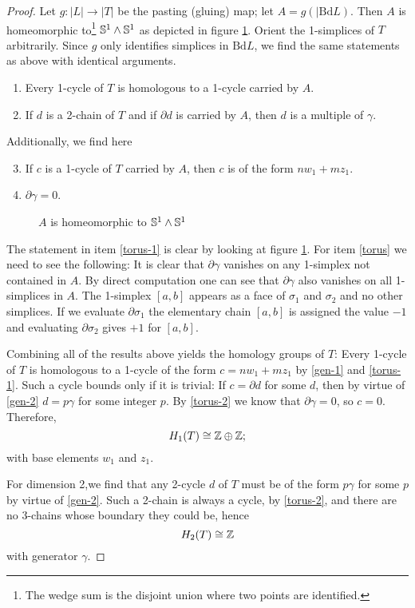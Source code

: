 \begin{proof}
	Let $g: |L|\to |T|$ be the pasting (gluing) map; let $A=g(|\mathrm{Bd} L)$. Then $A$ is homeomorphic to\footnote{The wedge sum is the disjoint union where two points are identified.} $\mathbb{S}^1\wedge \mathbb{S}^1$ as depicted in figure \ref{wege-of-s1}. Orient the 1-simplices of $T$ arbitrarily. Since $g$ only identifies simplices in $\mathrm{Bd} L$, we find the same statements as above with identical arguments.
	\begin{enumerate}
		\item \label{gen-1}Every 1-cycle of $T$ is homologous to a 1-cycle carried by $A$.
		\item \label{gen-2}If $d$ is a 2-chain of $T$ and if $\partial d$ is carried by $A$, then $d$ is a multiple of $\gamma$.
	\end{enumerate}
	Additionally, we find here
	\begin{enumerate}\setcounter{enumi}{2}
		\item \label{torus-1} If $c$ is a 1-cycle of $T$ carried by $A$, then $c$ is of the form $nw_1+mz_1$.
		\item \label{torus-2}$\partial \gamma=0$.
	\end{enumerate} 
	\begin{figure}
		\begin{center}
			\caption{$A$ is homeomorphic to $\mathbb{S}^1\wedge \mathbb{S}^1$\label{wege-of-s1}}
		\end{center}
	\end{figure}

The statement in item \ref{torus-1} is clear by looking at figure \ref{wege-of-s1}. For item \ref{torus} we need to see the following: 
It is clear that $\partial\gamma$ vanishes on any 1-simplex not contained in $A$. By direct computation one can see that $\partial\gamma$ also vanishes on all 1-simplices in $A$. The 1-simplex $[a,b]$ appears as a face of $\sigma_1$ and $\sigma_2$ and no other simplices. If we evaluate $\partial\sigma_1$ the elementary chain $[a,b]$ is assigned the value $-1$ and evaluating $\partial\sigma_2$ gives $+1$ for $[a,b]$.

Combining all of the results above yields the homology groups of $T$:
Every 1-cycle of $T$ is homologous to a 1-cycle of the form $c=nw_1+mz_1$ by \ref{gen-1} and \ref{torus-1}. Such a cycle bounds only if it is trivial: If $c=\partial d$ for some $d$, then by virtue of \ref{gen-2} $d=p\gamma$ for some integer $p$. By \ref{torus-2} we know that $\partial\gamma=0$, so $c=0$. Therefore,
\[H_1(T)\cong\mathbb{Z}\oplus\mathbb{Z}; \]
with base elements $w_1$ and $z_1$.

For dimension 2,we find that any 2-cycle $d$ of $T$ must be of the form $p\gamma$ for some $p$ by virtue of \ref{gen-2}. Such a 2-chain is always a cycle, by \ref{torus-2}, and there are no 3-chains whose boundary they could be, hence
\[
H_2(T)\cong \mathbb{Z}
\]
with generator $\gamma$.
\end{proof}




